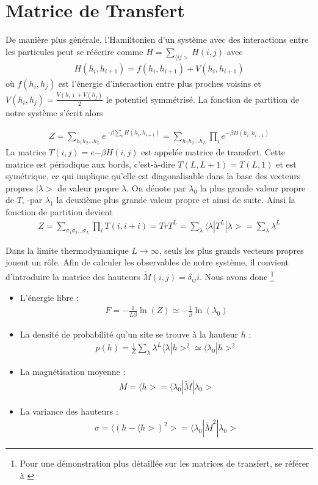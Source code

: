   \section{Matrice de Transfert}

	De manière plus générale, l'Hamiltonien d'un système avec des interactions entre les particules peut se réécrire comme $H = \sum_{\langle ij >} H(i,j)$ avec
\begin{align*}
  H(h_i,h_{i+1}) = f(h_i,h_{i+1}) + V(h_i,h_{i+1}) 
\end{align*}
où $f(h_i,h_j)$ est l'énergie d'interaction entre plus proches voisins et $V(h_i,h_j)=\frac{V(h_i)+V(h_j)}{2}$ le potentiel symmétrisé.
La fonction de partition de notre système s'écrit alors 

\begin{align*}
 Z = \sum_{h_1 h_2 ... h_L} e^{- \beta \sum_{i} H(h_i,h_{i+1})}  
   = \sum_{h_1 h_2 ... h_L} \prod_{i} e^{-\beta H(h_i,h_{i+1})} 
\end{align*}
La matrice $T(i,j) = e{-\beta H(i,j)}$ est appelée matrice de transfert. Cette matrice est périodique aux bords, c'est-à-dire $T(L,L+1) = T(L,1)$ et est symétrique, ce qui implique qu'elle est diagonalisable dans la base des vecteurs propres $|\lambda >$ de valeur propre $\lambda$. On dénote par $\lambda_0$ la plus grande valeur propre de $T$, -par $\lambda_1$ la deuxième plus grande valeur propre et ainsi de suite.
Ainsi la fonction de partition devient\cite{}
\begin{align}
  Z = \sum_{\sigma_1 \sigma_2 ... \sigma_{L}} \prod_{i} T(i,i+i) = Tr T^L  = \sum_\lambda \langle\lambda | T^L | \lambda> = \sum_\lambda \lambda^L
\end{align}

Dans la limite thermodynamique $L \to \infty$, seuls les plus grands vecteurs propres jouent un rôle. Afin de calculer les observables de notre système, il convient d'introduire la matrice des hauteurs $\tilde{M}(i,j) = \delta_{ij} i$. Nous avons donc \footnote{Pour une démonstration plus détaillée sur les matrices de transfert, se référer à \cite{matrice_transfert}}
\begin{itemize}
	\item L'énergie libre :  
	\begin{align}
		F =  - \frac{1}{L \beta} \ln(Z) \simeq - \frac{1}{\beta } \ln( \lambda_0)
	\end{align}
	\item La densité de probabilité qu'un site se trouve à la hauteur $h$ : 
	\begin{align}
		p(h) = \frac{1}{Z} \sum_\lambda \lambda^L \langle\lambda | h >^2 \simeq \langle \lambda_0 | h >^2
	\end{align}
	\item La magnétisation moyenne :
	\begin{align}
		M = \langle h > = \langle \lambda_0 | \tilde{M} | \lambda_0 > 
	\end{align}
	\item La variance des hauteurs :
	\begin{align}
		\sigma = \langle (h - \langle h >)^2 > =  \langle \lambda_0 | \tilde{M}^2 | \lambda_0 >
	\end{align}
\end{itemize}

